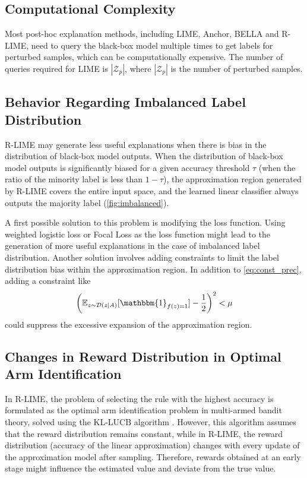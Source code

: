 \documentclass[runningheads]{llncs}
\begin{document}
\subsection{Computational Complexity}
Most post-hoc explanation methods, including LIME, Anchor, BELLA and R-LIME,
need to query the black-box model multiple times
to get labels for perturbed samples, which can be computationally expensive.
The number of queries required for LIME is $|\mathcal{Z}_p|$,
where $|\mathcal{Z}_p|$ is the number of perturbed samples.

\subsection{Behavior Regarding Imbalanced Label Distribution}
R-LIME may generate less useful explanations
when there is bias in the distribution of black-box model outputs.
When the distribution of black-box model outputs is significantly biased
for a given accuracy threshold $\tau$
(when the ratio of the minority label is less than $1-\tau$),
the approximation region generated by R-LIME covers the entire input space,
and the learned linear classifier always outputs the majority label
(\cref{fig:imbalanced}).

A first possible solution to this problem is modifying the loss function.
Using weighted logistic loss or Focal Loss \cite{lin2020focal}
as the loss function might lead to the generation of more useful explanations
in the case of imbalanced label distribution.
Another solution involves adding constraints
to limit the label distribution bias within the approximation region.
In addition to \cref{eq:const_prec}, adding a constraint like
\begin{equation}
  {\left(\mathbb{E}_{z\sim\mathcal{D}(z\mid A)}[\mathbbm{1}_{f(z)=1}]-\frac{1}{2}\right)}^2<\mu
\end{equation}
could suppress the excessive expansion of the approximation region.

\subsection{Changes in Reward Distribution in Optimal Arm Identification}\label{sec:reward}
{%
  \renewcommand{\arraystretch}{1.1}
  \begin{table}[tbp]
    \centering
    \caption{%
      Deviation between the estimated accuracy and the true accuracy.
      Deviation was relatively small considering confidence level $1-\delta=0.95$.
    }\label{tab:reward}
    
  \end{table}
}
In R-LIME,
the problem of selecting the rule with the highest accuracy is formulated
as the optimal arm identification problem in multi-armed bandit theory,
solved using the KL-LUCB algorithm \cite{kaufmann2013information}.
However, this algorithm assumes that the reward distribution remains constant,
while in R-LIME,
the reward distribution (accuracy of the linear approximation)
changes with every update of the approximation model after sampling.
Therefore, rewards obtained at an early stage
might influence the estimated value and deviate from the true value.
\end{document}
